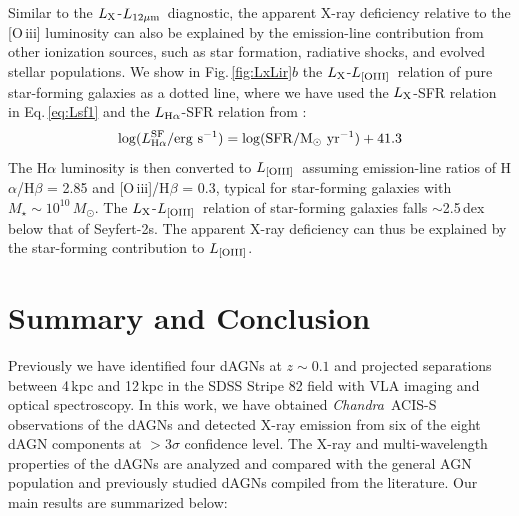 \documentclass[iop,revtex4,twocolumn,apj,numberedappendix,appendixfloats]{emulateapj}
\newcommand{\msun}{$M_{\odot}$}
\newcommand{\lx}{$L_{\rm X}$}
\newcommand{\lmir}{$L_{\rm 12\mu m}$}
\newcommand{\loiii}{$L_{\rm [OIII]}$}
\newcommand{\chandra}{{\it Chandra}}
\begin{document}
Similar to the \lx-\lmir\ diagnostic, the apparent X-ray deficiency relative to the [O\,{\sc iii}] luminosity can also be explained by the emission-line contribution from other ionization sources, such as star formation, radiative shocks, and evolved stellar populations. We show in Fig.\,\ref{fig:LxLir}$b$ the \lx-\loiii\ relation of pure star-forming galaxies as a dotted line, where we have used the \lx-SFR relation in Eq.\,\ref{eq:Lsf1} and the $L_{\rm H\alpha}$-SFR relation from \citet{Murphy11}: 
\begin{equation}
\log(L^{\rm SF}_{\rm H\alpha}/{\rm erg\ s^{-1}}) = \log({\rm SFR/M_\odot\ yr^{-1}}) + 41.3
\label{eq:lsf2}
\end{equation}
The H$\alpha$ luminosity is then converted to \loiii\ assuming emission-line ratios of H$\alpha$/H$\beta$ = 2.85 and [O\,{\sc iii}]/H$\beta$ = 0.3, typical for star-forming galaxies with $M_\star \sim 10^{10}$\,\msun. The \lx-\loiii\ relation of star-forming galaxies falls $\sim$2.5\,dex below that of Seyfert-2s. The apparent X-ray deficiency can thus be explained by the star-forming contribution to \loiii.

\section{Summary and Conclusion} \label{sec:summary}

Previously we have identified four dAGNs at $z \sim 0.1$ and projected separations between 4\,kpc and 12\,kpc in the SDSS Stripe 82 field with VLA imaging and optical spectroscopy. In this work, we have obtained \chandra\ ACIS-S observations of the dAGNs and detected X-ray emission from six of the eight dAGN components at $>$3$\sigma$ confidence level. The X-ray and multi-wavelength properties of the dAGNs are analyzed and compared with the general AGN population and previously studied dAGNs compiled from the literature. Our main results are summarized below:
\end{document}
